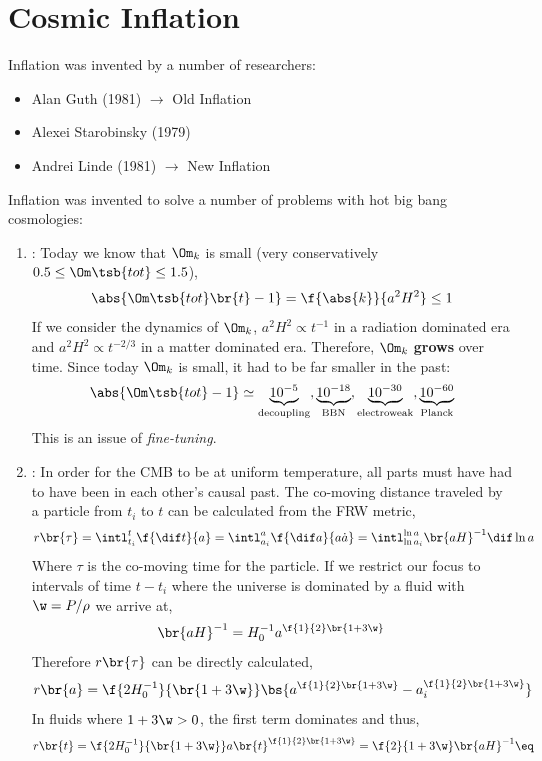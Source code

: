 \documentclass{article}
\begin{document}
\section{Cosmic Inflation}

Inflation was invented by a number of researchers:
\begin{itemize}
    \item Alan Guth (1981) $\to$ Old Inflation
    \item Alexei Starobinsky (1979)
    \item Andrei Linde (1981) $\to$ New Inflation
\end{itemize}

Inflation was invented to solve a number of problems with hot big bang cosmologies:
\begin{enumerate}
    \item {}: Today we know that $\Om_k$ is small (very conservatively $0.5 \leq \Om\tsb{tot} \leq 1.5$),
    \[ \abs{\Om\tsb{tot}\br{t} - 1} = \f{\abs{k}}{a^2 H^2} \leq 1 \]
    If we consider the dynamics of $\Om_k$, $a^2 H^2 \propto t^{-1}$ in a radiation dominated era and $a^2 H^2 \propto t^{-2/3}$ in a matter dominated era. Therefore, $\Om_k$ \textbf{grows} over time. Since today $\Om_k$ is small, it had to be far smaller in the past:
    \[ \abs{\Om\tsb{tot} - 1} \simeq \underbrace{10^{-5}}_{\text{decoupling}}, \underbrace{10^{-18}}_{\text{BBN}}, \underbrace{10^{-30}}_{\text{electroweak}}, \underbrace{10^{-60}}_{\text{Planck}} \]
    This is an issue of \textit{fine-tuning}.
    \item {}: In order for the CMB to be at uniform temperature, all parts must have had to have been in each other's causal past.
    The co-moving distance traveled by a particle from $t_i$ to $t$ can be calculated from the FRW metric,
    \[ r\br{\tau} = \intl_{t_i}^{t} \f{\dif t}{a} = \intl_{a_i}^{a}\f{\dif a}{a \dot a} = \intl_{\ln a_i}^{\ln a} \br{a H}^{-1}\dif \ln a \]
    Where $\tau$ is the co-moving time for the particle. If we restrict our focus to intervals of time $t - t_i$ where the universe is dominated by a fluid with $\w = P / \rho$ we arrive at,
    \[ \br{a H}^{-1} = H_{0}^{-1}a^{\f{1}{2}\br{1 + 3 \w}} \]
    Therefore $r\br{\tau}$ can be directly calculated,
    \[ r\br{a} = \f{2H_0^{-1}}{\br{1 + 3 \w}}\bs{a^{\f{1}{2}\br{1 + 3 \w}} - a_i^{\f{1}{2}\br{1 + 3 \w}}} \]
    In fluids where $1 + 3 \w > 0$, the first term dominates and thus,
    \[ r\br{t} = \f{2H_0^{-1}}{\br{1 + 3 \w}}a\br{t}^{\f{1}{2}\br{1 + 3 \w}} = \f{2}{1 + 3 \w}\br{a H}^{-1} \eq \label{eq:comoving_as_function_of_time} \]

\end{enumerate}
\end{document}
